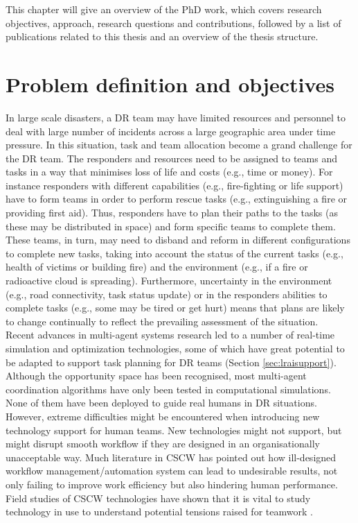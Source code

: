 This chapter will give an overview of the PhD work, which covers research objectives, approach, research questions and contributions, followed by a list of publications related to this thesis and an overview of the thesis structure.\\


\section{Problem definition and objectives}
In large scale disasters, a \ac{DR} team may have limited resources and personnel to deal with large number of incidents across a large geographic area under time pressure. In this situation, task and team allocation become a grand challenge for the \ac{DR} team. The responders and resources need to be assigned to teams and tasks in a way that minimises loss of life and costs (e.g., time or money). For instance responders with different capabilities (e.g., fire-fighting or life support) have to form teams in order to perform rescue tasks (e.g., extinguishing a fire or providing first aid). Thus, responders have to plan their paths to the tasks (as these may be distributed in space) and form specific teams to complete them. These teams, in turn, may need to disband and reform in different configurations to complete new tasks, taking into account the status of the current tasks (e.g., health of victims or building fire) and the environment (e.g., if a fire or radioactive cloud is spreading). Furthermore, uncertainty in the environment (e.g., road connectivity, task status update) or in the responders abilities to complete tasks (e.g., some may be tired or get hurt) means that plans are likely to change continually to reflect the prevailing assessment of the situation.\\

Recent advances in multi-agent systems research led to a number of real-time simulation and optimization technologies, some of which have great potential to be adapted to support task planning for \ac{DR} teams (Section \ref{sec:lraisupport}). Although the opportunity space has been recognised, most multi-agent coordination algorithms have only been tested in computational simulations. None of them have been deployed to guide real humans in \ac{DR} situations. However, extreme difficulties might be encountered when introducing new technology support for human teams. New technologies might not support, but might disrupt smooth workflow if they are designed in an organisationally unacceptable way. Much literature in \ac{CSCW} has pointed out how ill-designed workflow management/automation system can lead to undesirable results, not only failing to improve work efficiency but also hindering human performance. Field studies of \ac{CSCW} technologies have shown that it is vital to study technology in use to understand potential tensions raised for teamwork \cite{Bowers1994}. \\

